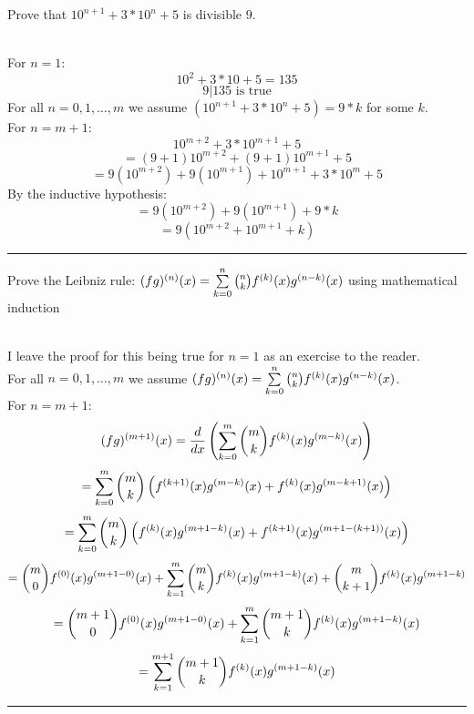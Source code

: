 \documentclass[11pt]{article}
\begin{document}
Prove that $10^{n+1} + 3*10^n + 5$ is divisible $9$.
\begin{solution} \hfill \\
    For $n=1$:\\
    $$10^2+3*10+5=135$$
    $$9|135\textrm{ is true}$$
    For all $n=0,1,\dots,m$ we assume $(10^{n+1} + 3*10^n + 5) = 9*k$ for some $k$.\\
    For $n=m+1$:
    $$10^{m+2}+3*10^{m+1}+5 $$
    $$= (9+1)10^{m+2}+(9+1)10^{m+1}+5$$
    $$= 9(10^{m+2})+9(10^{m+1})+10^{m+1} + 3*10^m+5$$
    By the inductive hypothesis:
    $$= 9(10^{m+2})+9(10^{m+1})+9*k$$
    $$= 9(10^{m+2}+10^{m+1}+k)$$
\end{solution}
\vspace{6pt}
\hrule
\vspace{6pt}

Prove the Leibniz rule: $(fg)^{(n)}(x) = \sum\limits^n_{k=0}\binom{n}{k}f^{(k)}(x)g^{(n-k)}(x)$ using mathematical induction
\begin{solution} \hfill \\
    I leave the proof for this being true for $n=1$ as an exercise to the reader.\\
    For all $n=0,1,\dots,m$ we assume $(fg)^{(n)}(x) = \sum\limits^n_{k=0}\binom{n}{k}f^{(k)}(x)g^{(n-k)}(x)$.\\
    For $n=m+1$:\\
    $$(fg)^{(m+1)}(x) = \frac{d}{dx}\left(\sum\limits^m_{k=0}\binom{m}{k}f^{(k)}(x)g^{(m-k)}(x)\right)$$
    $$= \sum\limits^m_{k=0}\binom{m}{k}\left(f^{(k+1)}(x)g^{(m-k)}(x) + f^{(k)}(x)g^{(m-k+1)}(x)\right)$$
    $$= \sum\limits^m_{k=0}\binom{m}{k}\left(f^{(k)}(x)g^{(m+1-k)}(x) + f^{(k+1)}(x)g^{(m+1-(k+1))}(x)\right)$$
    $$= \binom{m}{0}f^{(0)}(x)g^{(m+1-0)}(x) + 
        \sum\limits^m_{k=1}\binom{m}{k}f^{(k)}(x)g^{(m+1-k)}(x) + \binom{m}{k+1}f^{(k)}(x)g^{(m+1-k)}$$
    $$= \binom{m+1}{0}f^{(0)}(x)g^{(m+1-0)}(x) + \sum\limits^m_{k=1}\binom{m+1}{k}f^{(k)}(x)g^{(m+1-k)}(x)$$
    $$= \sum\limits^{m+1}_{k=1}\binom{m+1}{k}f^{(k)}(x)g^{(m+1-k)}(x)$$
\end{solution}
\vspace{6pt}
\hrule
\vspace{6pt}
\end{document}
